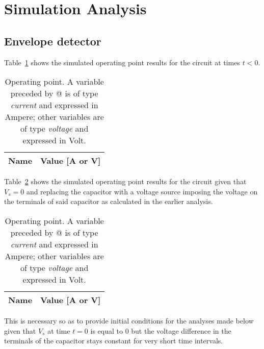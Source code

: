 \section{Simulation Analysis}
\label{sec:simulation}

\subsection{Envelope detector}

Table~\ref{tab:p1} shows the simulated operating point results for the circuit
at times $t<0$.

\begin{table}[H]
  \centering
  \begin{tabular}{|l|r|}
    \hline    
    {\bf Name} & {\bf Value [A or V]} \\ \hline
  \end{tabular}
  \caption{Operating point. A variable preceded by @ is of type {\em current}
    and expressed in Ampere; other variables are of type {\it voltage} and expressed in
    Volt.}
  \label{tab:p1}
\end{table}

Table~\ref{tab:p2} shows the simulated operating point results for the circuit
given that $V_s=0$ and replacing the capacitor with a
voltage source imposing the voltage on the terminals of said capacitor
as calculated in the earlier analysis.

\begin{table}[H]
    \centering
    \begin{tabular}{|l|r|}
      \hline    
      {\bf Name} & {\bf Value [A or V]} \\ \hline
    \end{tabular}
    \caption{Operating point. A variable preceded by @ is of type {\em current}
      and expressed in Ampere; other variables are of type {\it voltage} and expressed in
      Volt.}
    \label{tab:p2}
  \end{table}
This is necessary so as to provide initial conditions for the analyses made below given
that $V_s$ at time $t=0$ is equal to 0 but the voltage difference in the terminals of the
capacitor stays constant for very short time intervals.

